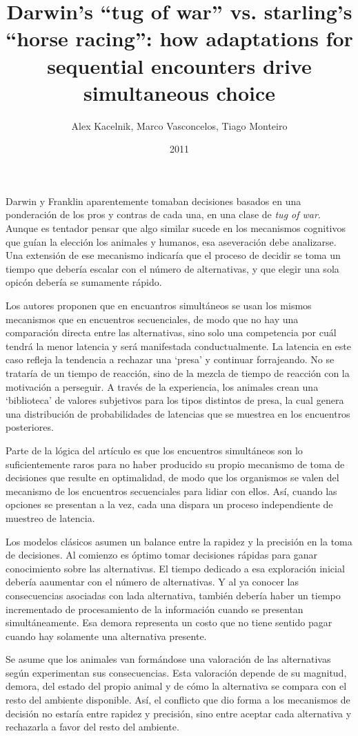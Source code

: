 \documentclass[a4paper,12pt]{article}
\title{Darwin's ``tug of war'' vs. starling's ``horse racing'': how adaptations for sequential encounters drive simultaneous choice}
\author{Alex Kacelnik, Marco Vasconcelos, Tiago Monteiro}
\date{2011}
\begin{document}
{\scshape\bfseries \maketitle}

Darwin y Franklin aparentemente tomaban decisiones basados en una ponderación de los pros y contras de cada una, en una clase de {\slshape tug of war}. Aunque es tentador pensar que algo similar sucede en los mecanismos cognitivos que guían la elección los animales y humanos, esa aseveración debe analizarse. Una extensión de ese mecanismo indicaría que el proceso de decidir se toma un tiempo que debería escalar con el número de alternativas, y que elegir una sola opicón debería se sumamente rápido.

Los autores proponen que en encuantros simultáneos se usan los mismos mecanismos que en encuentros secuenciales, de modo que no hay una comparación directa entre las alternativas, sino solo una competencia por cuál tendrá la menor latencia y será manifestada conductualmente. La latencia en este caso refleja la tendencia a rechazar una `presa' y continuar forrajeando. No se trataría de un tiempo de reacción, sino de la mezcla de tiempo de reacción con la motivación a perseguir. A través de la experiencia, los animales crean una `biblioteca' de valores subjetivos para los tipos distintos de presa, la cual genera una distribución de probabilidades de latencias que se muestrea en los encuentros posteriores.

Parte de la lógica del artículo es que los encuentros simultáneos son lo suficientemente raros para no haber producido su propio mecanismo de toma de decisiones que resulte en optimalidad, de modo que los organismos se valen del mecanismo de los encuentros secuenciales para lidiar con ellos. Así, cuando las opciones se presentan a la vez, cada una dispara un proceso independiente de muestreo de latencia.

Los modelos clásicos asumen un balance entre la rapidez y la precisión en la toma de decisiones. Al comienzo es óptimo tomar decisiones rápidas para ganar conocimiento sobre las alternativas. El tiempo dedicado a esa exploración inicial debería aaumentar con el número de alternativas. Y al ya conocer las consecuencias asociadas con lada alternativa, también debería haber un tiempo incrementado de procesamiento de la información cuando se presentan simultáneamente. Esa demora representa un costo que no tiene sentido pagar cuando hay solamente una alternativa presente.

Se asume que los animales van formándose una valoración de las alternativas según experimentan sus consecuencias. Esta valoración depende de su magnitud, demora, del estado del propio animal y de cómo la alternativa se compara con el resto del ambiente disponible. Así, el conflicto que dio forma a los mecanismos de decisión no estaría entre rapidez y precisión, sino entre aceptar cada alternativa y rechazarla a favor del resto del ambiente.
\end{document}
